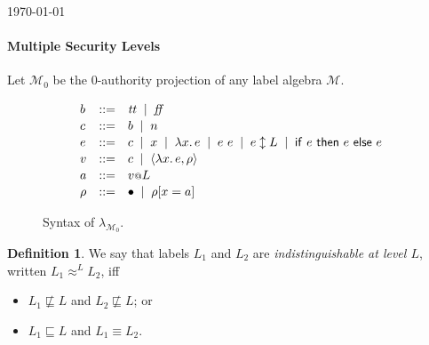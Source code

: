 \documentclass{article}
\makeatletter
\theoremstyle{definition}
\newtheorem{definition}{Definition}
\newcommand{\at}{\ensuremath{{\scriptstyle{@}}}}
\makeatother
\begin{document}
\begin{flushright}
  \today
\end{flushright}

\paragraph{Multiple Security Levels}
Let $\mathcal{M}_{0}$ be the 0-authority projection of any label algebra
$\mathcal{M}$.

\begin{figure}[ht]
  \centering
  \[
  \begin{array}[t]{lcl}
    b & ::= &
    \mathit{tt}\;\; |\;\;
    \mathit{ff}
    \\[0.3ex]
    c & :: = &
    b\;\; |\;\;
    n
    \\[0.3ex]
    e & ::= &
    c\;\; |\;\;
    x\;\; |\;\;
    \lambda{x}.\, e\;\; |\;\;
    e\ e\;\; |\;\;
    e \updownarrow L\;\; |\;\;
    \mathsf{if}\ e\ \mathsf{then}\ e\ \mathsf{else}\ e
    \\[0.3ex]
    v & ::= &
    c\;\; |\;\;
    \langle{\lambda{x}.\, e, \rho\rangle}
    \\[0.3ex]
    a & ::= &
    v \at L
    \\[0.3ex]
    \rho & ::= &
    \bullet\;\; |\;\;
    \rho[x = a]
  \end{array}
  \]
  \caption{Syntax of $\lambda_{\mathcal{M}_{0}}$.}
  \label{fig:syntax}
\end{figure}

\begin{definition}
  We say that labels $L_1$ and $L_2$ are \emph{indistinguishable at
    level $L$}, written $L_1 \approx^{L} L_2$, iff
  \begin{itemize}
  \item
    $L_1 \not\sqsubseteq L$ and
    $L_2 \not\sqsubseteq L$; or
  \item
    $L_1 \sqsubseteq L$ and
    $L_1 \equiv L_2$.
  \end{itemize}
  \label{def:lab-equiv}
\end{definition}
\end{document}
